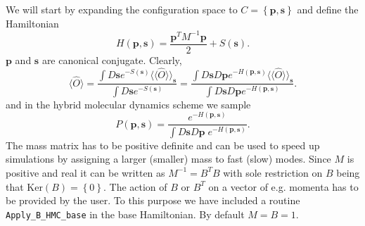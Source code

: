 We will start by expanding the configuration space to $ C = \left\{ \pmb{p}, \pmb{s}  \right\} $   and define the Hamiltonian 
\begin{equation}
  H(\pmb{p}, \pmb{s} )   = \frac{ \pmb{p}^{T} M^{-1}  \pmb{p} }{2}  +   S(\pmb{s} ).
\end{equation}
 $\pmb{p} $  and $\pmb{s}$ are canonical conjugate.  Clearly, 
 \begin{equation}
 \langle \hat{O} \rangle   =  \frac{ \int D \pmb{s} e^{- S(\pmb{s} ) }  \langle \langle \hat{O} \rangle \rangle_{\pmb{s} } } { \int D \pmb{s} e^{- S(\pmb{s} )}}
 = \frac{ \int D \pmb{s} D \pmb{p} e^{- H(\pmb{p},\pmb{s})}  \langle \langle \hat{O} \rangle \rangle_{\pmb{s} } } { \int D \pmb{s}  D \pmb{p} e^{-H(\pmb{p},\pmb{s}) }}.
 \end{equation}
 and in the hybrid molecular dynamics scheme we sample
 \begin{equation}
 	P(\pmb{p},\pmb{s})   =   \frac{e^{-H (\pmb{p},\pmb{s})}}{ \int D \pmb{s}  D \pmb{p} \; e^{-H(\pmb{p},\pmb{s}) } }.
 \end{equation}
 The  mass   matrix  has   to  be  positive  definite  and  can be  used  to  speed  up  simulations  by  assigning  a  larger  (smaller)  mass  to   fast (slow)   modes.   Since   $M$ is  positive  and  real   it  can be   written  as   $M^{-1}  = B^T  B $   with  sole  restriction on  $B$  being  that  $\text{Ker}(B) =  \left\{ 0 \right\}  $.   The  action of  $B$  or  $B^T$  on a  vector of    e.g.  momenta  has  to  be  provided  by  the  user.  To  this purpose  we  have included  a 
routine  \texttt{Apply\_B\_HMC\_base}  in the base  Hamiltonian.  By   default    $M = B = 1$. 
 
